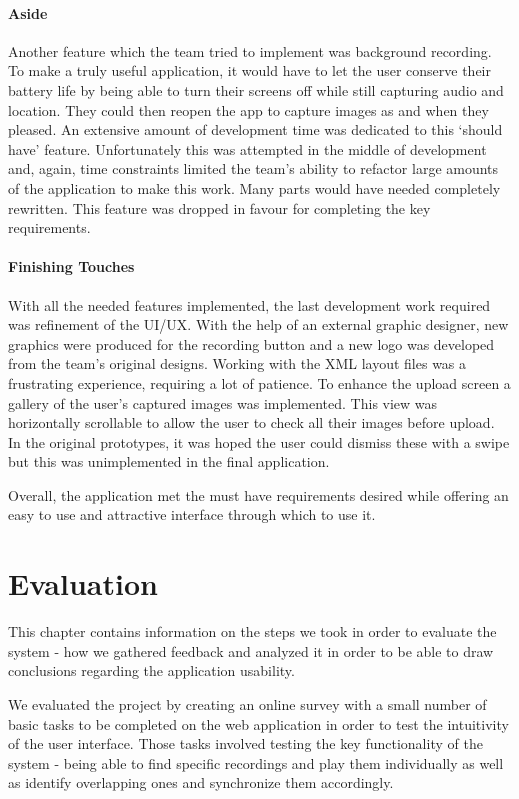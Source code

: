 \documentclass{l3proj}
\begin{document}
\subsubsection{Aside}
Another feature which the team tried to implement was background recording. To make a truly useful application, it would have to let the user conserve their battery life by being able to turn their screens off while still capturing audio and location. They could then reopen the app to capture images as and when they pleased. An extensive amount of development time was dedicated to this ‘should have’ feature. Unfortunately this was attempted in the middle of development and, again, time constraints limited the team's ability to refactor large amounts of the application to make this work. Many parts would have needed completely rewritten. This feature was dropped in favour for completing the key requirements.

\subsubsection{Finishing Touches}
With all the needed features implemented, the last development work required was refinement of the UI/UX. With the help of an external graphic designer, new graphics were produced for the recording button and a new logo was developed from the team's original designs. Working with the XML layout files was a frustrating experience, requiring a lot of patience. To enhance the upload screen a gallery of the user's captured images was implemented. This view was horizontally scrollable to allow the user to check all their images before upload. In the original prototypes, it was hoped the user could dismiss these with a swipe but this was unimplemented in the final application.

Overall, the application met the must have requirements desired while offering an easy to use and attractive interface through which to use it.

\chapter{Evaluation}

This chapter contains information on the steps we took in order to evaluate the system - how we gathered feedback and analyzed it in order to be able to draw conclusions regarding the application usability.

We evaluated the project by creating an online survey with a small number of basic tasks to be completed on the web application in order to test the intuitivity of the user interface. Those tasks involved testing the key functionality of the system - being able to find specific recordings and play them individually as well as identify overlapping ones and synchronize them accordingly.
\end{document}

